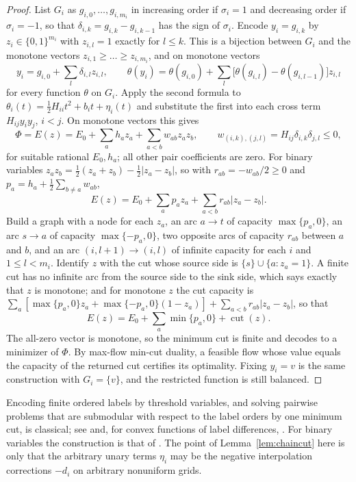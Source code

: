 \begin{proof}
List $G_i$ as $g_{i,0},\dots,g_{i,m_i}$ in increasing order if $\sigma_i=1$ and decreasing order
if $\sigma_i=-1$, so that $\delta_{i,k}=g_{i,k}-g_{i,k-1}$ has the sign of $\sigma_i$. Encode
$y_i=g_{i,k}$ by $z_i\in\{0,1\}^{m_i}$ with $z_{i,l}=1$ exactly for $l\le k$. This is a bijection
between $G_i$ and the monotone vectors $z_{i,1}\ge\dots\ge z_{i,m_i}$, and on monotone vectors
\[
y_i=g_{i,0}+\sum_l\delta_{i,l}z_{i,l},\qquad
\theta(y_i)=\theta(g_{i,0})+\sum_l\bigl[\theta(g_{i,l})-\theta(g_{i,l-1})\bigr]z_{i,l}
\]
for every function $\theta$ on $G_i$. Apply the second formula to
$\theta_i(t)=\tfrac12H_{ii}t^2+b_it+\eta_i(t)$ and substitute the first into each cross term
$H_{ij}y_iy_j$, $i<j$. On monotone vectors this gives
\[
\Phi=E(z)=E_0+\sum_ah_az_a+\sum_{a<b}w_{ab}z_az_b,\qquad
w_{(i,k),(j,l)}=H_{ij}\delta_{i,k}\delta_{j,l}\le0,
\]
for suitable rational $E_0,h_a$; all other pair coefficients are zero. For binary
variables $z_az_b=\tfrac12(z_a+z_b)-\tfrac12|z_a-z_b|$, so with $r_{ab}=-w_{ab}/2\ge0$ and
$p_a=h_a+\tfrac12\sum_{b\neq a}w_{ab}$,
\[
E(z)=E_0+\sum_ap_az_a+\sum_{a<b}r_{ab}|z_a-z_b|.
\]
Build a graph with a node for each $z_a$, an arc $a\to t$ of capacity $\max\{p_a,0\}$, an arc
$s\to a$ of capacity $\max\{-p_a,0\}$, two opposite arcs of capacity $r_{ab}$ between $a$ and
$b$, and an arc $(i,l+1)\to(i,l)$ of infinite capacity for each $i$ and $1\le l<m_i$. Identify
$z$ with the cut whose source side is $\{s\}\cup\{a:z_a=1\}$. A finite cut has no
infinite arc from the source side to the sink side, which says exactly that $z$ is monotone; and
for monotone $z$ the cut capacity is
$\sum_a[\max\{p_a,0\}z_a+\max\{-p_a,0\}(1-z_a)]+\sum_{a<b}r_{ab}|z_a-z_b|$, so that
\[
E(z)=E_0+\sum_a\min\{p_a,0\}+\operatorname{cut}(z).
\]
The all-zero vector is monotone, so the minimum cut is finite and decodes to a minimizer of
$\Phi$. By max-flow min-cut duality, a feasible flow whose value equals the capacity of the
returned cut certifies its optimality. Fixing $y_i=v$ is the same construction with $G_i=\{v\}$,
and the restricted function is still balanced.
\end{proof}

\begin{remark}
Encoding finite ordered labels by threshold variables, and solving pairwise problems that are
submodular with respect to the label orders by one minimum cut, is classical; see
\cite[Section~4]{SchlesingerFlach2006} and, for convex functions of label differences,
\cite{Ishikawa2003}. For binary variables the construction is that of
\cite{Ivanescu1965,PicardRatliff1975,KolmogorovZabih2004}. The point of
Lemma~\ref{lem:chaincut} here is only that the arbitrary unary terms $\eta_i$ may be the
negative interpolation corrections $-d_i$ on arbitrary nonuniform grids.
\end{remark}

